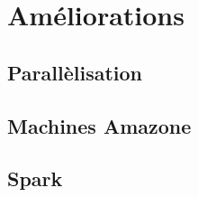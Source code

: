 \chapter{Améliorations}
\label{ch:improve}

\section{Parallèlisation}
\section{Machines Amazone}
\section{Spark}
